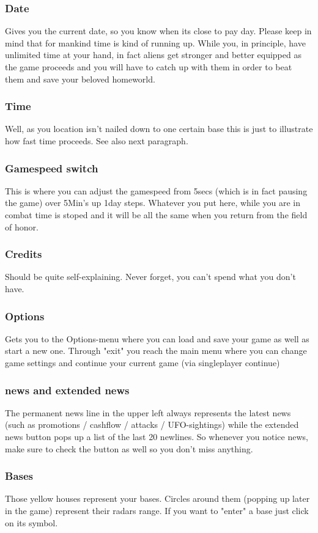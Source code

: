 \subsubsection{Date}
Gives you the current date, so you know when its close to pay day. Please keep in mind that for mankind time is kind of running up. While you, in principle, have unlimited time at your hand, in fact aliens get stronger and better equipped as the game proceeds and you will have to catch up with them in order to beat them and save your beloved homeworld.
\subsubsection{Time}
Well, as you location isn't nailed down to one certain base this is just to illustrate how fast time proceeds. See also next paragraph.
\subsubsection{Gamespeed switch}
This is where you can adjust the gamespeed from 5secs (which is in fact pausing the game) over 5Min's up 1day steps. Whatever you put here, while you are in combat time is stoped and it will be all the same when you return from the field of honor.
\subsubsection{Credits}
Should be quite self-explaining. Never forget, you can't spend what you don't have.
\subsubsection{Options}
Gets you to the Options-menu where you can load and save your game as well as start a new one.
Through "exit" you reach the main menu where you can change game settings and continue your current game (via singleplayer \hookrightarrow continue)
\subsubsection{news and extended news}
The permanent news line in the upper left always represents the latest news (such as promotions / cashflow / attacks / UFO-sightings) while the extended news button pops up a list of the last 20 newlines.
So whenever you notice news, make sure to check the button as well so you don't miss anything. 
\subsubsection{Bases}
Those yellow houses represent your bases. Circles around them (popping up later in the game) represent their radars range.  If you want to "enter" a base just click on its symbol.
